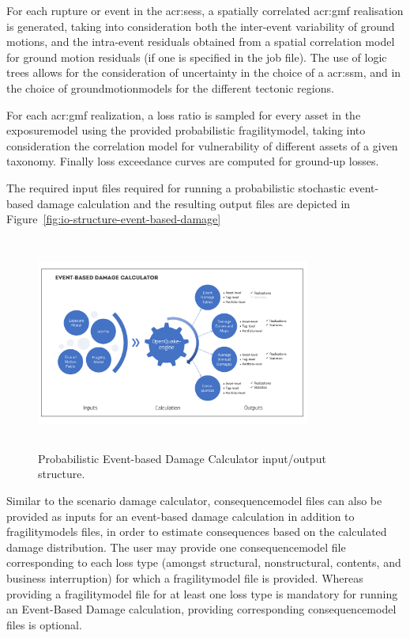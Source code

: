 For each \gls{rupture} or event in the \glspl{acr:ses}, a spatially correlated
\gls{acr:gmf} realisation is generated, taking into consideration both the
inter-event variability of ground motions, and the intra-event residuals
obtained from a spatial correlation model for ground motion residuals (if one 
is specified in the job file). The use of logic trees allows for the 
consideration of uncertainty in the choice of a \glsdesc{acr:ssm}, and in the 
choice of \glspl{groundmotionmodel} for the different tectonic regions.

For each \gls{acr:gmf} realization, a loss ratio is sampled for every
\gls{asset} in the \gls{exposuremodel} using the provided probabilistic
\gls{fragilitymodel}, taking into consideration the correlation model for
vulnerability of different \glspl{asset} of a given taxonomy. Finally loss
exceedance curves are computed for ground-up losses.

The required input files required for running a probabilistic stochastic
event-based damage calculation and the resulting output files are depicted in
Figure~\ref{fig:io-structure-event-based-damage}

\begin{figure}[ht]
\centering
\includegraphics[width=9cm,height=7cm]{figures/risk/io-structure-event-based-damage.pdf}
\caption{Probabilistic Event-based Damage Calculator input/output structure.}
\label{fig:io-structure-event-based-risk}
\end{figure}

Similar to the scenario damage calculator, \gls{consequencemodel} files can also be
provided as inputs for an event-based damage calculation in addition to
\glspl{fragilitymodel} files, in order to estimate consequences based on the
calculated damage distribution. The user may provide one
\gls{consequencemodel} file corresponding to each loss type (amongst
structural, nonstructural, contents, and business interruption) for which a
\gls{fragilitymodel} file is provided. Whereas providing a
\gls{fragilitymodel} file for at least one loss type is mandatory for running
an Event-Based Damage calculation, providing corresponding \gls{consequencemodel}
files is optional.
